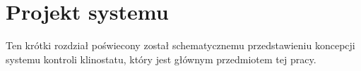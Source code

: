 \graphicspath{{./PBL/images}}

\chapter{Projekt systemu}

Ten krótki rozdział poświecony został schematycznemu przedstawieniu koncepcji systemu kontroli klinostatu, który jest głównym przedmiotem tej pracy.